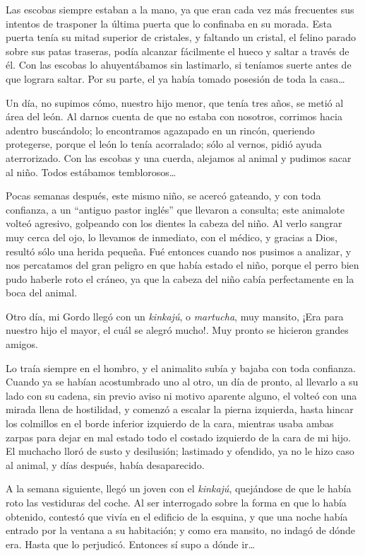 \documentclass[letterpaper, 12pt]{book}
\begin{document}
Las escobas siempre estaban a la mano, ya que eran cada vez más frecuentes sus intentos de trasponer la última puerta que lo confinaba en su morada. Esta puerta tenía su mitad superior de cristales, y faltando un cristal, el felino parado sobre sus patas traseras, podía alcanzar fácilmente el hueco y saltar a través de él. Con las escobas lo ahuyentábamos sin lastimarlo, si teníamos suerte antes de que lograra saltar. Por su parte, el ya había tomado posesión de toda la casa\ldots

Un día, no supimos cómo, nuestro hijo menor, que tenía tres años, se metió al área del león. Al darnos cuenta de que no estaba con nosotros, corrimos hacia adentro buscándolo; lo encontramos agazapado en un rincón, queriendo protegerse, porque el león lo tenía acorralado; sólo al vernos, pidió ayuda aterrorizado. Con las escobas y una cuerda, alejamos al animal y pudimos sacar al niño. Todos estábamos temblorosos\ldots

Pocas semanas después, este mismo niño, se acercó gateando, y con toda confianza, a un ``antiguo pastor inglés'' que llevaron a consulta; este animalote volteó agresivo, golpeando con los dientes la cabeza del niño. Al verlo sangrar muy cerca del ojo, lo llevamos de inmediato, con el médico, y gracias a Dios, resultó sólo una herida pequeña. Fué entonces cuando nos pusimos a analizar, y nos percatamos del gran peligro en que había estado el niño, porque el perro bien pudo haberle roto el cráneo, ya que la cabeza del niño cabía perfectamente en la boca del animal.

Otro día, mi Gordo llegó con un \textit{kinkajú}, o \textit{martucha}, muy mansito, ¡Era para nuestro hijo el mayor, el cuál se alegró mucho!. Muy pronto se hicieron grandes amigos.

Lo traía siempre en el hombro, y el animalito subía y bajaba con toda confianza. Cuando ya se habían acostumbrado uno al otro, un día de pronto, al llevarlo a su lado con su cadena, sin previo aviso ni motivo aparente alguno, el volteó con una mirada llena de hostilidad, y comenzó a escalar la pierna izquierda, hasta hincar los colmillos en el borde inferior izquierdo de la cara, mientras usaba ambas zarpas para dejar en mal estado todo el costado izquierdo de la cara de mi hijo. El muchacho lloró de susto y desilusión; lastimado y ofendido, ya no le hizo caso al animal, y días después, había desaparecido.

A la semana siguiente, llegó un joven con el \textit{kinkajú}, quejándose de que le había roto las vestiduras del coche. Al ser interrogado sobre la forma en que lo había obtenido, contestó que vivía en el edificio de la esquina, y que una noche había entrado por la ventana a su habitación; y como era mansito, no indagó de dónde era. Hasta que lo perjudicó. Entonces sí supo a dónde ir\ldots
\end{document}
